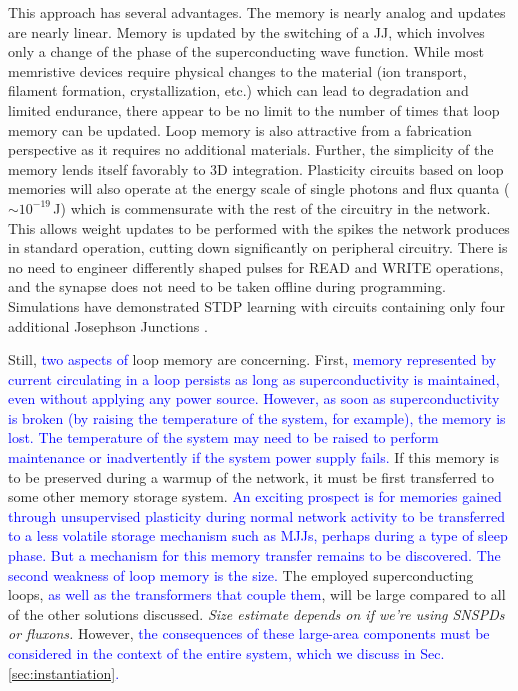 \documentclass[twocolumn]{article}
\begin{document}
This approach has several advantages. The memory is nearly analog and updates are nearly linear. Memory is updated by the switching of a JJ, which involves only a change of the phase of the superconducting wave function. While most memristive devices require physical changes to the material (ion transport, filament formation, crystallization, etc.) which can lead to degradation and limited endurance, there appear to be no limit to the number of times that loop memory can be updated. Loop memory is also attractive from a fabrication perspective as it requires no additional materials. Further, the simplicity of the memory lends itself favorably to 3D integration. Plasticity circuits based on loop memories will also operate at the energy scale of single photons and flux quanta ($\sim 10^{-19}$\,J) which is commensurate with the rest of the circuitry in the network. This allows weight updates to be performed with the spikes the network produces in standard operation, cutting down significantly on peripheral circuitry. There is no need to engineer differently shaped pulses for READ and WRITE operations, and the synapse does not need to be taken offline during programming. Simulations have demonstrated STDP learning with circuits containing only four additional Josephson Junctions \cite{shainline2019superconducting}. 

Still, \textcolor{blue}{two aspects of} loop memory are concerning. First, \textcolor{blue}{memory represented by current circulating in a loop persists as long as superconductivity is maintained, even without applying any power source. However, as soon as superconductivity is broken (by raising the temperature of the system, for example), the memory is lost. The temperature of the system may need to be raised to perform maintenance or inadvertently if the system power supply fails.} If this memory is to be preserved during a warmup of the network, it must be first transferred to some other memory storage system. \textcolor{blue}{An exciting prospect is for memories gained through unsupervised plasticity during normal network activity to be transferred to a less volatile storage mechanism such as MJJs, perhaps during a type of sleep phase. But a mechanism for this memory transfer remains to be discovered. The second weakness of loop memory is the size.} The employed superconducting loops, \textcolor{blue}{as well as the transformers that couple them}, will be large compared to all of the other solutions discussed. \textit{Size estimate depends on if we're using SNSPDs or fluxons.} However, \textcolor{blue}{the consequences of these large-area components must be considered in the context of the entire system, which we discuss in Sec.\,\ref{sec:instantiation}.} 
\end{document}
